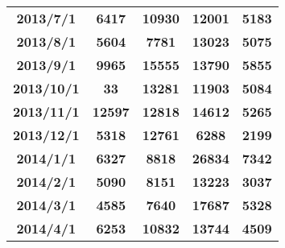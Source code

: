 \begin{table}[htbp]
\begin{tabular}{ccccc}
    \textbf{2013/7/1} & \textbf{6417} & \textbf{10930} & \textbf{12001} & \textbf{5183} \\
    \textbf{2013/8/1} & \textbf{5604} & \textbf{7781} & \textbf{13023} & \textbf{5075} \\
    \textbf{2013/9/1} & \textbf{9965} & \textbf{15555} & \textbf{13790} & \textbf{5855} \\
    \textbf{2013/10/1} & \textbf{33} & \textbf{13281} & \textbf{11903} & \textbf{5084} \\
    \textbf{2013/11/1} & \textbf{12597} & \textbf{12818} & \textbf{14612} & \textbf{5265} \\
    \textbf{2013/12/1} & \textbf{5318} & \textbf{12761} & \textbf{6288} & \textbf{2199} \\
    \textbf{2014/1/1} & \textbf{6327} & \textbf{8818} & \textbf{26834} & \textbf{7342} \\
    \textbf{2014/2/1} & \textbf{5090} & \textbf{8151} & \textbf{13223} & \textbf{3037} \\
    \textbf{2014/3/1} & \textbf{4585} & \textbf{7640} & \textbf{17687} & \textbf{5328} \\
    \textbf{2014/4/1} & \textbf{6253} & \textbf{10832} & \textbf{13744} & \textbf{4509} \\
    \bottomrule
    \end{tabular}%
  \label{tab:汽车销售数据}%
\end{table}%




















